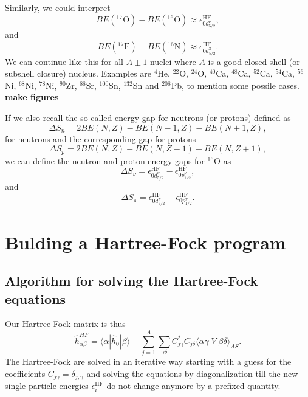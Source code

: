 Similarly, we could interpret
\[
BE(^{17}\mathrm{O})-BE(^{16}\mathrm{O})\approx \epsilon_{0d^{\nu}_{5/2}}^{\mathrm{HF}}, 
\]
and 
\[
BE(^{17}\mathrm{F})-BE(^{16}\mathrm{N})\approx\epsilon_{0d^{\pi}_{5/2}}^{\mathrm{HF}}.
\]
We can continue like this for all $A\pm 1$ nuclei where $A$ is a good closed-shell (or subshell closure)
nucleus. Examples are $^{4}$He, $^{22}$O, $^{24}$O, $^{40}$Ca, $^{48}$Ca, $^{52}$Ca, $^{54}$Ca, $^{56}$Ni, 
$^{68}$Ni, $^{78}$Ni, $^{90}$Zr, $^{88}$Sr, $^{100}$Sn, $^{132}$Sn and $^{208}$Pb, to mention some possile cases.
{\bf make figures}

If we also recall the so-called energy gap for neutrons (or protons) defined as
\[
\Delta S_n= 2BE(N,Z)-BE(N-1,Z)-BE(N+1,Z),
\]
for neutrons and the corresponding gap for protons
\[
\Delta S_p= 2BE(N,Z)-BE(N,Z-1)-BE(N,Z+1),
\]
we can define the neutron and proton energy gaps for $^{16}$O as
\[
\Delta S_{\nu}=\epsilon_{0d^{\nu}_{5/2}}^{\mathrm{HF}}-\epsilon_{0p^{\nu}_{1/2}}^{\mathrm{HF}}, 
\]
and 
\[
\Delta S_{\pi}=\epsilon_{0d^{\pi}_{5/2}}^{\mathrm{HF}}-\epsilon_{0p^{\pi}_{1/2}}^{\mathrm{HF}}. 
\]

\section{Bulding a Hartree-Fock program}
\subsection{Algorithm for solving the Hartree-Fock equations}

Our Hartree-Fock matrix  is thus
\[
\hat{h}_{\alpha\beta}^{HF}=\langle \alpha | \hat{h}_0 | \beta \rangle+
\sum_{j=1}^A\sum_{\gamma\delta} C^*_{j\gamma}C_{j\delta}\langle \alpha\gamma|V|\beta\delta\rangle_{AS}.
\]
The Hartree-Fock are solved in an iterative way starting with a guess
for the coefficients $C_{j\gamma}=\delta_{j,\gamma}$ and solving the
equations by diagonalization till the new single-particle energies
$\epsilon_i^{\mathrm{HF}}$ do not change anymore by a prefixed
quantity.


